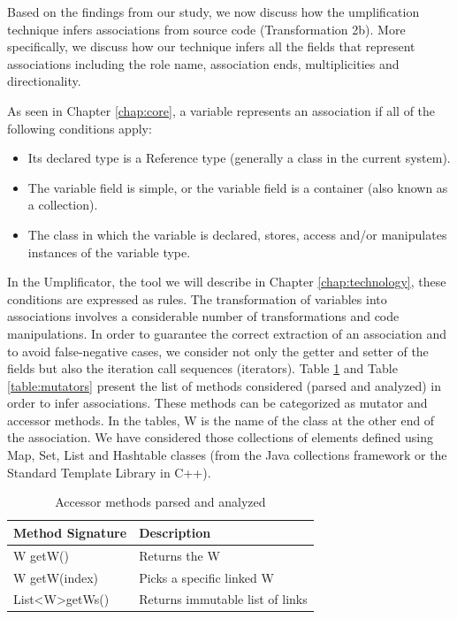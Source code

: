 Based on the findings from our study, we now discuss how the umplification technique infers associations from source code (Transformation 2b). More specifically, we discuss how our technique infers all the fields that represent associations including the role name, association ends, multiplicities and directionality.

As seen in Chapter \ref{chap:core}, a variable represents an association if all of the following conditions apply:
\begin{itemize}
\item Its declared type is a Reference type (generally a class in the current system).
\item The variable field is simple, or the variable field is a container (also known as a collection).
\item The class in which the variable is declared, stores, access and/or manipulates instances of the variable type.
\end{itemize}

In the Umplificator, the tool we will describe in Chapter \ref{chap:technology}, these conditions are expressed as rules. The transformation of variables into associations involves a considerable number of transformations and code manipulations. In order to guarantee the correct extraction of an association and to avoid false-negative cases, we consider not only the getter and setter of the fields but also the iteration call sequences (iterators). Table \ref{table:accessors} and Table \ref{table:mutators} present the list of methods considered (parsed and analyzed) in order to infer associations. These methods can be categorized as mutator and accessor methods. In the tables, W is the name of the class at the other end of the association. We have considered those collections of elements defined using Map, Set, List and Hashtable classes (from the Java collections framework or the Standard Template Library in C++).

\begin{table}
\caption{Accessor methods parsed and analyzed}
\label{table:accessors}
\centering
\begin{tabular}{ll}
\toprule
\rowcolor[HTML]{BBDAFF}
\textbf{Method Signature}   & \textbf{Description}                               \\ 
\hline
W getW()  		& Returns the W    \\ 
W getW(index)   & Picks a specific linked W   \\ 
List\textless W\textgreater getWs()   & Returns immutable list of links  \\ 
\hline
\end{tabular}
\end{table}

